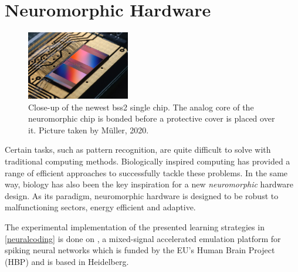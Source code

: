 %





\section{Neuromorphic Hardware}

\begin{figure}
	\centering
	\includegraphics[width=0.4\textwidth]{figures/HXcloseup.JPG}
	\caption[Close-up of the newest \gls{bss2} single chip.]{Close-up of the newest \gls{bss2} single chip. The analog core of the neuromorphic chip is bonded before a protective cover is placed over it. Picture taken by M{\"u}ller, 2020.} 
	\label{hxcloseup}
\end{figure}

Certain tasks, such as pattern recognition, are quite difficult to solve with traditional computing methods.  Biologically inspired computing has provided a range of efficient approaches to successfully tackle these problems. In the same way, biology has also been the key inspiration for a new \emph{neuromorphic} hardware design. As its paradigm, neuromorphic hardware is designed to be robust to malfunctioning sectors, energy efficient and adaptive. 

The experimental implementation of the presented learning strategies in \cref{neuralcoding} is done on , a mixed-signal accelerated emulation platform for spiking neural networks which is funded by the EU's Human Brain Project (HBP) and is based in Heidelberg.

